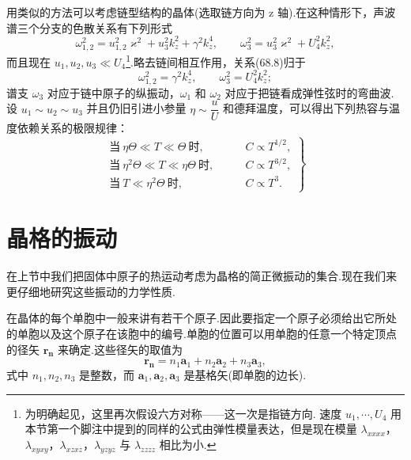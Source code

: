 用类似的方法可以考虑链型结构的晶体(选取链方向为 z 轴).在这种情形下，声波谱三个分支的色散关系有下列形式
\begin{equation}
  \omega_{1,2}^2=u_{1,2}^2\varkappa^2+u_3^2k_z^2+\gamma^2k_z^4,\qquad
  \omega_3^2=u_3^2\varkappa^2+U_4^2k_z^2,
\end{equation}
而且现在 $u_1,u_2,u_3\ll U_4$\footnote{为明确起见，这里再次假设六方对称——这一次是指链方向. 速度 $u_1,\cdots,U_4$ 用本节第一个脚注中提到的同样的公式由弹性模量表达，但是现在模量 $\lambda_{xxxx}$，$\lambda_{xyxy}$，$\lambda_{xzxz}$，$\lambda_{yzyz}$ 与 $\lambda_{zzzz}$ 相比为小.}.略去链间相互作用，关系(68.8)归于
\begin{equation*}
  \omega_{1,2}^2=\gamma^2k_z^4,\qquad
  \omega_3^2=U_4^2k_z^2;
\end{equation*}
谱支 $\omega_3$ 对应于链中原子的纵振动，$\omega_1$ 和 $\omega_2$ 对应于把链看成弹性弦时的弯曲波.设 $u_1\sim u_2\sim u_3$ 并且仍旧引进小参量 $\eta\sim\dfrac{u}{U}$ 和德拜温度，可以得出下列热容与温度依赖关系的极限规律：
\begin{equation}
\left.\begin{aligned}
  \text{当}\ \eta\Theta\ll T\ll\Theta\ \text{时},\qquad &C\propto T^{1/2},\\
  \text{当}\ \eta^2\Theta\ll T\ll\eta\Theta\ \text{时},\qquad &C\propto T^{3/2},\\
  \text{当}\ T\ll\eta^2\Theta\ \text{时},\qquad &C\propto T^3.
\end{aligned}\right\}
\end{equation}

\section{晶格的振动}

在上节中我们把固体中原子的热运动考虑为晶格的简正微振动的集合.现在我们来更仔细地研究这些振动的力学性质.

在晶体的每个单胞中一般来讲有若干个原子.因此要指定一个原子必须给出它所处的单胞以及这个原子在该胞中的编号.单胞的位置可以用单胞的任意一个特定顶点的径矢 $\boldsymbol{r}_{\boldsymbol{n}}$ 来确定.这些径矢的取值为
\begin{equation}
  \boldsymbol{r}_{\boldsymbol{n}}=n_1\boldsymbol{a}_1+n_2\boldsymbol{a}_2+n_3\boldsymbol{a}_3,
\end{equation}
式中 $n_1,n_2,n_3$ 是整数，而 $\boldsymbol{a}_1,\boldsymbol{a}_2,\boldsymbol{a}_3$ 是基格矢(即单胞的边长).

